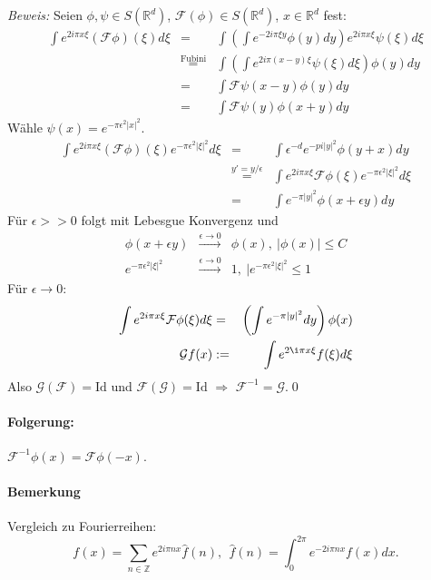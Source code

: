 \documentclass[12pt]{extreport} %
\numberwithin{equation}{section}
\newcommand{\R}{\mathbb{R}} %
\newcommand{\Z}{\mathbb{Z}} %
\newcommand{\f}{\hat{f}}
\newcommand{\F}{\mathcal{F}}
\newcommand{\G}{\mathcal{G}}
\newcommand{\Bew}{\emph{Beweis: }}
\begin{document}
	\Bew Seien $\phi,\psi\in S(\R^d)$, $\F(\phi)\in S(\R^d)$, $x\in \R^d$ fest:
	\begin{eqnarray}
		\int e^{2i\pi x\xi}(\F\phi)(\xi)d\xi &=& \int \left(\int e^{-2i\pi \xi y}\phi(y) dy\right) e^{2i\pi x\xi} \psi(\xi)d\xi\nonumber\\
		&\overset{\text{Fubini}}{=}& \int\left(\int e^{2i\pi (x-y)\xi}\psi(\xi)d\xi\right)\phi(y)dy\nonumber\\
		&=& \int\F\psi(x-y)\phi(y)dy \nonumber\\
		&=& \int \F\psi(y)\phi(x+y)dy\nonumber
	\end{eqnarray}
	Wähle $\psi(x) = e^{-\pi\epsilon^2|x|^2}$.
	\begin{eqnarray}
		\int e^{2i\pi x\xi}(\F\phi)(\xi)e^{-\pi\epsilon^2|\xi|^2}d\xi &=& \int \epsilon^{-d} e^{-pi|y|^2}\phi(y+x)dy\nonumber\\
		&\overset{y' = y/\epsilon}{=}& \int e^{2i\pi x\xi}\F\phi (\xi) e^{-\pi\epsilon^2|\xi|^2}d\xi \nonumber \\
		&=& \int e^{-\pi |y|^2}\phi (x+\epsilon y)dy\nonumber
	\end{eqnarray}
	Für $\epsilon>> 0$ folgt mit Lebesgue Konvergenz und
	\begin{eqnarray}
		\phi(x+\epsilon y)&\overset{\epsilon\rightarrow 0}{\longrightarrow}&\phi(x),~|\phi(x)|\leq C\nonumber\\
		e^{-\pi\epsilon^2|\xi|^2}&\overset{\epsilon\rightarrow 0}{\longrightarrow}& 1, ~|e^{-\pi\epsilon^2|\xi|^2}\leq 1\nonumber
	\end{eqnarray}
	Für $\epsilon\rightarrow 0$:
	\begin{eqnarray}
		\int e^{2i\pi x\xi}\F\phi(\xi)d\xi &=& \left(\int e^{-\pi|y|^2}dy \right)\phi(x)\nonumber\\
		\G f(x)&:=& \int e^{2\i\pi x\xi}f(\xi)d\xi\nonumber
	\end{eqnarray}
	Also $\G(\F) = \text{Id}$ und $\F(\G) = \text{Id}$ $\Rightarrow$ $\F^{-1} = \G$.\qed
	
	\paragraph{Folgerung:} $\F^{-1}\phi(x) = \F\phi(-x)$.
	
	\paragraph{Bemerkung} Vergleich zu Fourierreihen: 
	$$f(x)=\sum_{n\in \Z} e^{2i\pi n x}\f(n),~~ \f(n) = \int_{0}^{2\pi}e^{-2i\pi n x}f(x) dx.$$
	
\end{document}
